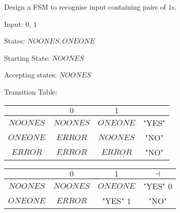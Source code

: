 \documentclass[a4paper,12pt]{article}
\begin{document}
Design a FSM to recognise input containing pairs of $1$s.


Input: $0$, $1$

States: ${NOONES, ONEONE}$

Starting State: ${NOONES}$

Accepting states: ${NOONES}$

Transition Table:

\begin{tabular}{|c|c|c|c|}
\hline
		 	& $0$ 			& $1$ 			& 			\\
\hline
$NOONES$	& $NOONES$		& $ONEONE$		& "YES"	\\
\hline
$ONEONE$	& $ERROR$		& $NOONES$		& "NO"	\\
\hline
$ERROR$	& $ERROR$		& $ERROR$		& "NO"	\\
\hline
\end{tabular}


\begin{tabular}{|c|c|c|c|}
\hline
		 	& $0$ 			& $1$ 			& $\dashv$		\\
\hline
$NOONES$	& $NOONES$		& $ONEONE$		& "YES" $0$		\\
\hline
$ONEONE$	& $ERROR$		& "YES" $1$		& "NO"			\\
\hline
\end{tabular}
\end{document}
